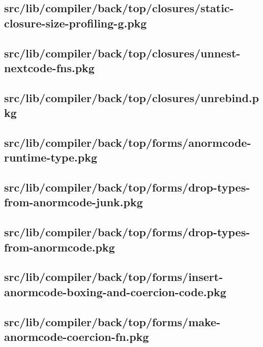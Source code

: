 \subsection{src/lib/compiler/back/top/closures/static-closure-size-profiling-g.pkg}


\subsection{src/lib/compiler/back/top/closures/unnest-nextcode-fns.pkg}


\subsection{src/lib/compiler/back/top/closures/unrebind.pkg}


\subsection{src/lib/compiler/back/top/forms/anormcode-runtime-type.pkg}


\subsection{src/lib/compiler/back/top/forms/drop-types-from-anormcode-junk.pkg}


\subsection{src/lib/compiler/back/top/forms/drop-types-from-anormcode.pkg}


\subsection{src/lib/compiler/back/top/forms/insert-anormcode-boxing-and-coercion-code.pkg}


\subsection{src/lib/compiler/back/top/forms/make-anormcode-coercion-fn.pkg}


